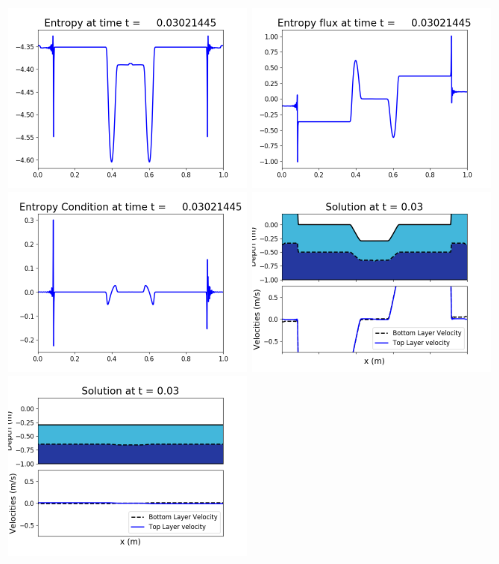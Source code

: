 \documentclass[11pt]{article}
\begin{document}
\vskip 10pt 
\includegraphics[width=0.475\textwidth]{frame0070fig1007.png}
\includegraphics[width=0.475\textwidth]{frame0070fig1008.png}
\vskip 10pt 
\includegraphics[width=0.475\textwidth]{frame0070fig1009.png}
\vskip 10pt 
\includegraphics[width=0.475\textwidth]{frame0071fig1001.png}
\includegraphics[width=0.475\textwidth]{frame0071fig1002.png}
\end{document}
